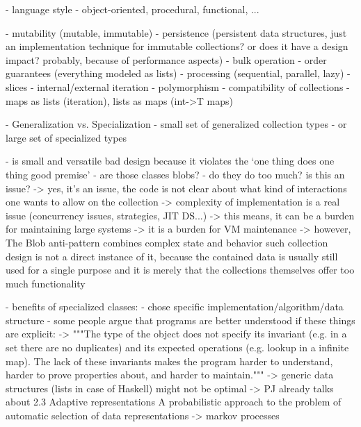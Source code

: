 \documentclass[sigconf, 10pt]{acmart}
\begin{document}
\begin{note}
  - language style
    - object-oriented, procedural, functional, ...
  
  - mutability (mutable, immutable)
  - persistence (persistent data structures, just an implementation technique for immutable collections? or does it have a design impact? probably, because of performance aspects)
  - bulk operation
    - order guarantees (everything modeled as lists)
    - processing (sequential, parallel, lazy)
    - slices
    - internal/external iteration
  - polymorphism 
    - compatibility of collections
      - maps as lists (iteration), lists as maps (int->T maps)

  - Generalization vs. Specialization  
  - small set of generalized collection types 
  - or large set of specialized types
  
  - is small and versatile bad design because it violates the `one thing does   one thing good premise'
    - are those classes blobs? \citep{brown1998antipatterns}
    - do they do too much? is this an issue?
     -> yes, it's an issue, the code is not clear about what kind of 
        interactions one wants to allow on the collection
     -> complexity of implementation is a real issue (concurrency issues,
        strategies, JIT DS...)
     -> this means, it can be a burden for maintaining large systems
     -> it is a burden for VM maintenance
     -> however, The Blob anti-pattern combines complex state and behavior
        such collection design is not a direct instance of it, because
        the contained data is usually still used for a single purpose and
        it is merely that the collections themselves offer too much
        functionality

    - benefits of specialized classes:
      - chose specific implementation/algorithm/data structure
      - some people argue that programs are better understood if these things are explicit: \citep{PeytonJones:1996:BTC}
        -> """The type of the object does not specify its invariant (e.g. in a set there are no duplicates) and its expected operations (e.g. lookup in a infinite map). The lack of these invariants makes the program harder to understand, harder to prove properties about, and harder to maintain."""
        -> generic data structures (lists in case of Haskell) might not be optimal
         -> PJ already talks about 2.3 Adaptive representations
         A probabilistic approach to the problem of automatic selection of data representations \citep{Chuang:1996:PAP}
          -> markov processes


\end{note}
\end{document}
